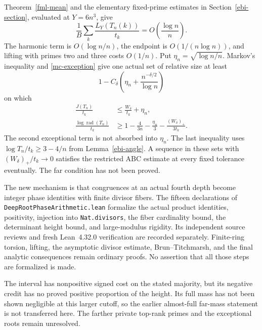 Theorem~\ref{fml-mean} and the elementary fixed-prime estimates in
Section~\ref{ebi-section}, evaluated at \(Y=6n^3\), give
\[
 \frac1B\sum_k\frac{L_Y(T_n(k))}{t_k}
       =O\!\left(\frac{\log n}{n}\right).
\]
The harmonic term is \(O(\log n/n)\), the endpoint is
\(O(1/(n\log n))\), and lifting with primes two and three costs
\(O(1/n)\). Put \(\eta_n=\sqrt{\log n/n}\).
Markov's inequality and \eqref{mc-exception} give one actual set of
relative size at least
\[
 1-C_\delta\left(\eta_n+\frac{n^{-\delta/2}}{\log n}\right)
\]
on which
\begin{align}
 \frac{J(T_n)}{t_k}&\leq\frac{W_\delta}{t_k}+\eta_n,
       \label{mc-signed}\\
 \frac{\log\operatorname{rad}(T_n)}{t_k}
   &\geq1-\frac4{3n}-\frac{\eta_n}{3}
                    -\frac{(W_\delta)_+}{3t_k}.
       \label{mc-radical}
\end{align}
The second exceptional term is not absorbed into \(\eta_n\).
The last inequality uses
\(\log T_n/t_k\geq3-4/n\) from Lemma~\ref{ebi-angle}.
A sequence in these sets with \((W_\delta)_+/t_k\to0\) satisfies
the restricted ABC estimate at every fixed tolerance eventually.
The far condition has not been proved.

The new mechanism is that congruences at an actual fourth depth
become integer phase identities with finite divisor fibers.
The fifteen declarations of \texttt{DeepRootPhase\allowbreak Arithmetic.lean}
formalize the actual product identities, positivity, injection into
\texttt{Nat.divisors}, the fiber cardinality bound, the determinant
height bound, and large-modulus rigidity. Its independent source
reviews and fresh Lean~4.32.0 verification are recorded separately.
Finite-ring torsion, lifting, the asymptotic divisor estimate,
Brun--Titchmarsh, and the final analytic consequences remain ordinary
proofs. No assertion that all those steps are formalized is made.

The interval has nonpositive signed cost on the stated majority,
but its negative credit has no proved positive proportion of the
height. Its full mass has not been shown negligible at this larger
cutoff, so the earlier almost-full far-mass statement is not
transferred here. The farther private top-rank primes and the
exceptional roots remain unresolved.

